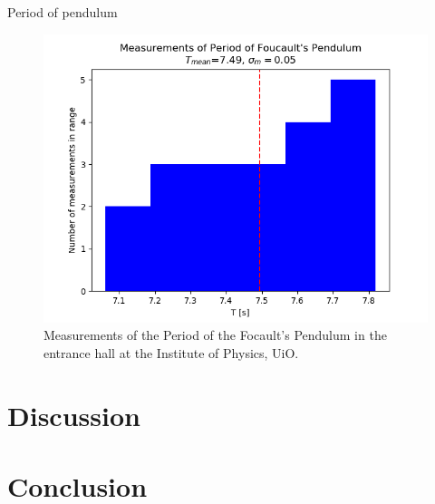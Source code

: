 \documentclass[%
 reprint,
 amsmath,amssymb,
 aps,
]{revtex4-1}
\begin{document}
  \begin{table}
    \caption{Period of pendulum}
    \label{tab:pendel}
    
  \end{table}
  \begin{figure}[h!]
    \center
    \includegraphics[scale=0.5]{scripts/figs/period.png}
    \caption{Measurements of the Period of the Focault's Pendulum in the entrance hall at the Institute of Physics, UiO.}
    \label{fig:pendel}
  \end{figure}


\section{\label{sec:disc}Discussion}
\section{\label{sec:conc}Conclusion}


    
\end{document}
